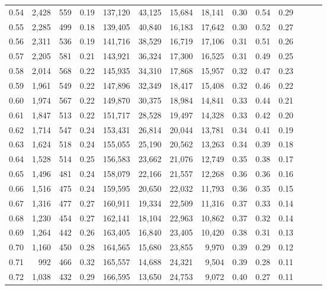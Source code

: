 \begin{tabular}{rrrrrrrrrrrrrr}
0.54 &  2,428 &    559 &  0.19 &  137,120 &   43,125 &  15,684 &  18,141 &  0.30 &  0.54 &      0.29 \\
0.55 &  2,285 &    499 &  0.18 &  139,405 &   40,840 &  16,183 &  17,642 &  0.30 &  0.52 &      0.27 \\
0.56 &  2,311 &    536 &  0.19 &  141,716 &   38,529 &  16,719 &  17,106 &  0.31 &  0.51 &      0.26 \\
0.57 &  2,205 &    581 &  0.21 &  143,921 &   36,324 &  17,300 &  16,525 &  0.31 &  0.49 &      0.25 \\
0.58 &  2,014 &    568 &  0.22 &  145,935 &   34,310 &  17,868 &  15,957 &  0.32 &  0.47 &      0.23 \\
0.59 &  1,961 &    549 &  0.22 &  147,896 &   32,349 &  18,417 &  15,408 &  0.32 &  0.46 &      0.22 \\
0.60 &  1,974 &    567 &  0.22 &  149,870 &   30,375 &  18,984 &  14,841 &  0.33 &  0.44 &      0.21 \\
0.61 &  1,847 &    513 &  0.22 &  151,717 &   28,528 &  19,497 &  14,328 &  0.33 &  0.42 &      0.20 \\
0.62 &  1,714 &    547 &  0.24 &  153,431 &   26,814 &  20,044 &  13,781 &  0.34 &  0.41 &      0.19 \\
0.63 &  1,624 &    518 &  0.24 &  155,055 &   25,190 &  20,562 &  13,263 &  0.34 &  0.39 &      0.18 \\
0.64 &  1,528 &    514 &  0.25 &  156,583 &   23,662 &  21,076 &  12,749 &  0.35 &  0.38 &      0.17 \\
0.65 &  1,496 &    481 &  0.24 &  158,079 &   22,166 &  21,557 &  12,268 &  0.36 &  0.36 &      0.16 \\
0.66 &  1,516 &    475 &  0.24 &  159,595 &   20,650 &  22,032 &  11,793 &  0.36 &  0.35 &      0.15 \\
0.67 &  1,316 &    477 &  0.27 &  160,911 &   19,334 &  22,509 &  11,316 &  0.37 &  0.33 &      0.14 \\
0.68 &  1,230 &    454 &  0.27 &  162,141 &   18,104 &  22,963 &  10,862 &  0.37 &  0.32 &      0.14 \\
0.69 &  1,264 &    442 &  0.26 &  163,405 &   16,840 &  23,405 &  10,420 &  0.38 &  0.31 &      0.13 \\
0.70 &  1,160 &    450 &  0.28 &  164,565 &   15,680 &  23,855 &   9,970 &  0.39 &  0.29 &      0.12 \\
0.71 &    992 &    466 &  0.32 &  165,557 &   14,688 &  24,321 &   9,504 &  0.39 &  0.28 &      0.11 \\
0.72 &  1,038 &    432 &  0.29 &  166,595 &   13,650 &  24,753 &   9,072 &  0.40 &  0.27 &      0.11 \\

\end{tabular}
